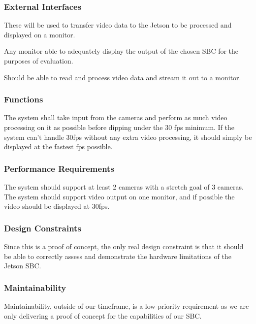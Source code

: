 \subsubsection{External Interfaces}
\begin{description}[leftmargin=2cm,labelindent=2cm]
	\item [Two 1080p Cameras] These will be used to transfer video data to the Jetson to be processed and displayed on a monitor.
	\item [Monitor] Any monitor able to adequately display the output of the chosen SBC for the purposes of evaluation. 
	\item [Jetson] Should be able to read and process video data and stream it out to a monitor.\\
\end{description}

\subsubsection{Functions}
The system shall take input from the cameras and perform as much video processing on it as possible before dipping under the 30 fps minimum.
If the system can't handle 30fps without any extra video processing, it should simply be displayed at the fastest fps possible.\\

\subsubsection{Performance Requirements}
The system should support at least 2 cameras with a stretch goal of 3 cameras.
The system should support video output on one monitor, and if possible the video should be displayed at 30fps.\\

\subsubsection{Design Constraints}
Since this is a proof of concept, the only real design constraint is that it should be able to correctly assess and demonstrate the hardware limitations of the Jetson SBC.\\

\subsubsection{Maintainability}
Maintainability, outside of our timeframe, is a low-priority requirement as we are only delivering a proof of concept for the capabilities of our SBC.\\


